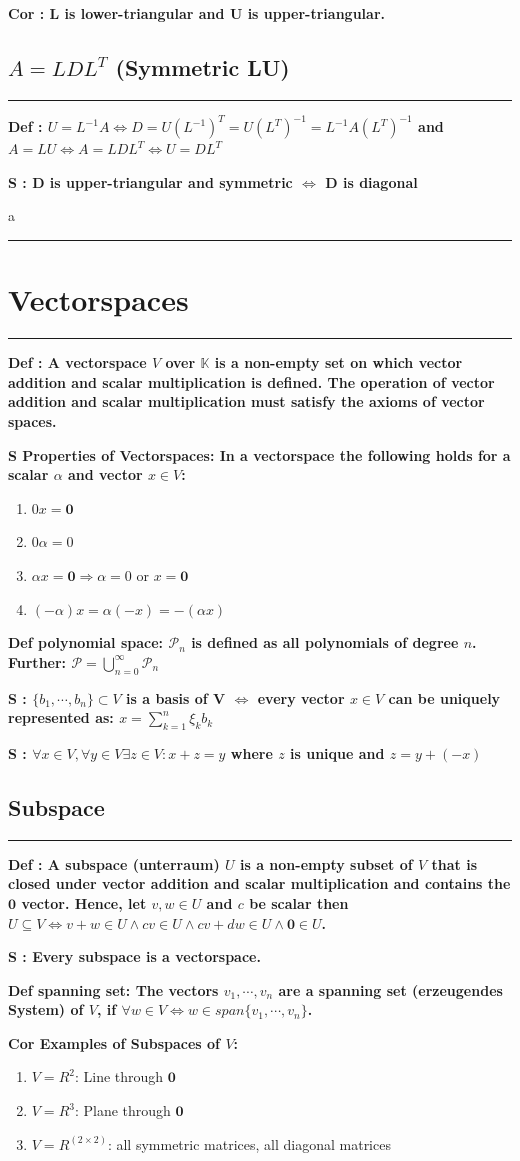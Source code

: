\documentclass[7pt,landscape, margin = 0.1mm]{article}
\newcommand{\titellinie}{\rule{1.\linewidth}{0.75pt}}
\newcommand*{\mysection}[2][black]{\vskip 0pt \titellinie\vspace{-20pt}\section{#2}\vspace{-14pt}\titellinie \colorlet{chaptercolor}{#1}}
\newcommand*{\mysubsection}[1]{\vspace{-2mm}\color{chaptercolor}\subsection{ #1 }
\vspace{-1mm}\hrule\vspace{1.5mm}\color{black}
\vspace{2mm}}
\newcommand{\DEF}[2]{\color{chaptercolor}\bf{Def #1}:\color{black}    \hspace{0.2cm} #2}
\newcommand{\COR}[2]{\color{chaptercolor}\bf{Cor #1}:\color{black}    \hspace{0.2cm} #2}
\newcommand{\SA}[2]{\color{chaptercolor}\bf{S #1}:\color{black}    \hspace{0.2cm} #2}
\begin{document}
\begin{multicols}{4}
\begin{flushleft}
{{\COR{}{L is lower-triangular and U is upper-triangular.}

\mysubsection{$A=LDL^T$ (Symmetric LU)}
\DEF{}{$U=L^{-1}A \Leftrightarrow D=U(L^{-1})^T=U(L^T)^{-1}=L^{-1}A(L^T)^{-1}$ and $A=LU \Leftrightarrow A=LDL^T \Leftrightarrow U=DL^T$}

\SA{}{D is upper-triangular and symmetric $\Leftrightarrow$ D is diagonal}

a

\mysection[JungleGreen]{\centering Vectorspaces}
\DEF{}{A vectorspace $V$ over $\mathbb{K}$ is a non-empty set on which vector addition and scalar multiplication is defined. The operation of vector addition and scalar multiplication must satisfy the axioms of vector spaces.}

\SA{Properties of Vectorspaces}{In a vectorspace the following holds for a scalar $\alpha$ and vector $x \in V$: \begin{enumerate}[nolistsep]
 \item $0x = \bm{0}$
 \item $0\alpha = 0$
 \item $\alpha x = \bm{0} \Rightarrow \alpha = 0$ or $x = \bm{0}$
 \item $(-\alpha)x = \alpha(-x) = -(\alpha x)$
\end{enumerate}}

\DEF{polynomial space}{$\mathcal{P}_n$ is defined as all polynomials of degree $n$. Further: $ \mathcal{P} = \bigcup_{n=0}^{\infty} \mathcal{P}_n $}

\SA{}{$\{ b_1 , \cdots , b_n\} \subset V$ is a basis of V $\Leftrightarrow $ every vector $x \in V$ can be uniquely represented as: $x = \sum_{k=1}^{n}\xi_k b_k $}

\SA{}{$\forall x \in V, \forall y \in V \exists z \in V: x+z=y$ where $z$ is unique and $z = y + (-x) $}

\mysubsection{Subspace}
\DEF{}{A subspace (unterraum) $U$ is a non-empty subset of $V$ that is closed under vector addition and scalar multiplication and contains the $\bm{0}$ vector. Hence, let $v,w \in U$ and $c$ be scalar then $U \subseteq V \Leftrightarrow v+w \in U \land cv \in U \land cv+dw \in U \land \bm{0} \in U$.}

\SA{}{Every subspace is a vectorspace.}

\DEF{spanning set}{The vectors $v_1 , \cdots , v_n$ are a spanning set (erzeugendes System) of $V$, if $\forall w \in V \Leftrightarrow w \in span \{ v_1 , \cdots , v_n \}$.}

\COR{Examples of Subspaces of $V$}{\begin{enumerate}[nolistsep]
    \item $V=R^2$: Line through $\bm{0}$
    \item $V=R^3$: Plane through $\bm{0}$
    \item $V=R^(2 \times 2)$: all symmetric matrices, all diagonal matrices
\end{enumerate}}

}}
\end{flushleft}
\end{multicols}
\end{document}
